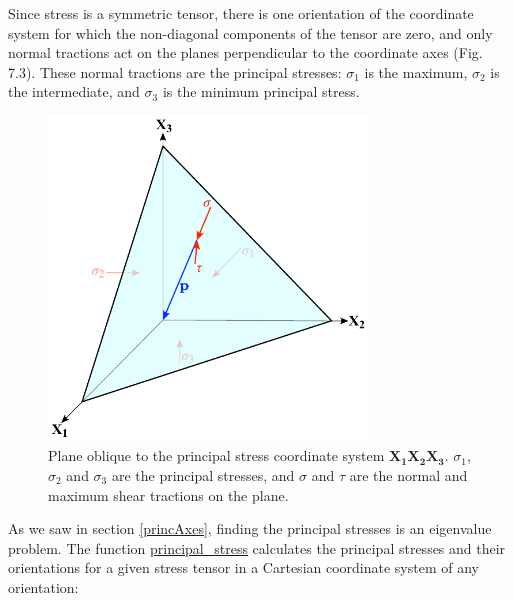 \documentclass[a4paper , 12pt]{book}
\begin{document}
Since stress is a symmetric tensor, there is one orientation of the coordinate system for which the non-diagonal components of the tensor are zero, and only normal tractions act on the planes perpendicular to the coordinate axes (Fig. 7.3). These normal tractions are the principal stresses: $\sigma_1$ is the maximum, $\sigma_2$ is the intermediate, and $\sigma_3$ is the minimum principal stress.

\begin{figure}[ht]
    \centering
    \includegraphics[width=8.5cm]{ch7f3.pdf}
    \caption{Plane oblique to the principal stress coordinate system $\mathbf{X_1X_2X_3}$. $\sigma_1$, $\sigma_2$ and $\sigma_3$ are the principal stresses, and $\sigma$ and $\tau$ are the normal and maximum shear tractions on the plane.}
\end{figure}

As we saw in section \ref{princAxes}, finding the principal stresses is an eigenvalue problem. The function \href{https://github.com/nfcd/compGeo/blob/master/source/functions/principal_stress.py}{principal\_stress} calculates the principal stresses and their orientations for a given stress tensor in a Cartesian coordinate system of any orientation:
\end{document}
